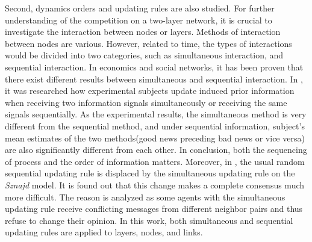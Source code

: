 Second, dynamics orders and updating rules are also studied. For further understanding of the competition on a two-layer network, it is crucial to investigate the interaction between nodes or layers. Methods of interaction between nodes are various.\parencite{sirbu2017} However, related to time, the types of interactions would be divided into two categories, such as simultaneous interaction, and sequential interaction. In economics and social networks, it has been proven that there exist different results between simultaneous and sequential interaction.\parencite{hoffman2011, dietrich2004} In \parencite{hoffman2011}, it was researched how experimental subjects update induced prior information when receiving two information signals simultaneously or receiving the same signals sequentially. As the experimental results, the simultaneous method is very different from the sequential method, and under sequential information, subject’s mean estimates of the two methods(good news preceding bad news or vice versa) are also significantly different from each other. In conclusion, both the sequencing of process and the order of information matters. Moreover, in \parencite{dietrich2004}, the usual random sequential updating rule is displaced by the simultaneous updating rule on the \textit{Sznajd} model. It is found out that this change makes a complete consensus much more difficult. The reason is analyzed as some agents with the simultaneous updating rule receive conflicting messages from different neighbor pairs and thus refuse to change their opinion. In this work, both simultaneous and sequential updating rules are applied to layers, nodes, and links.

